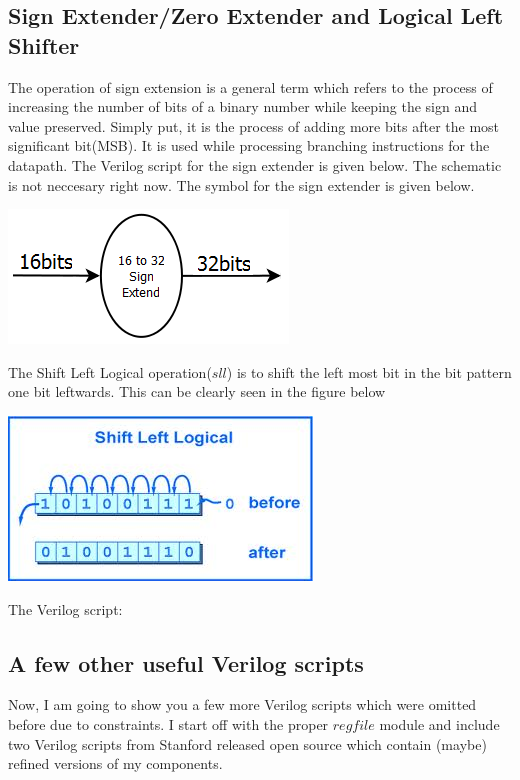 \documentclass[11pt]{article}
\begin{document}
\begin{description}
\subsection{Sign Extender/Zero Extender and Logical Left Shifter}
The operation of sign extension is a general term which refers to the process of increasing the number of bits of a binary number while keeping the sign and value preserved. Simply put, it is the process of adding more bits after the most significant bit(MSB). It is used while processing branching instructions for the datapath. The Verilog script for the sign extender is given below. The schematic is not neccesary right now. The symbol for the sign extender is given below.

\includegraphics[scale=0.6]{signex.png}






The Shift Left Logical operation($sll$) is to shift the left most bit in the bit pattern one bit leftwards. This can be clearly seen in the figure below

\includegraphics[scale=0.7]{sll.jpg}

The Verilog script:


\subsection{A few other useful Verilog scripts}
Now, I am going to show you a few more Verilog scripts which were omitted before due to constraints. I start off with the proper $regfile$ module and include two Verilog scripts from Stanford released open source which contain (maybe) refined versions of my components. 


\end{description}
\end{document}

